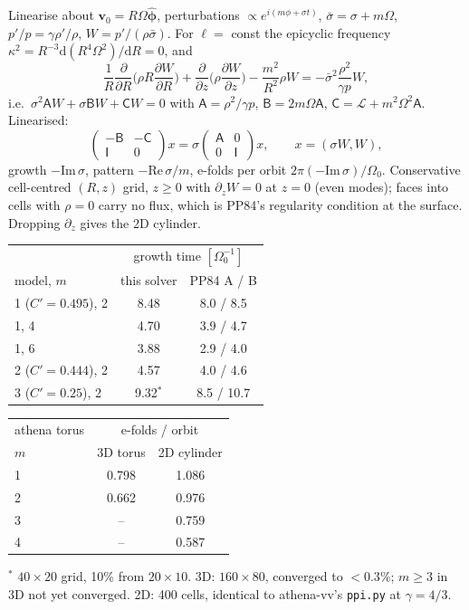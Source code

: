 \documentclass[10pt,a4paper]{article}
\newcommand{\dd}{\mathrm{d}}
\newcommand{\pd}{\partial}
\newcommand{\vv}{\mathbf{v}}
\begin{document}
Linearise about $\vv_0=R\Omega\hat{\boldsymbol\phi}$, perturbations $\propto e^{i(m\phi+\sigma t)}$,
$\bar\sigma=\sigma+m\Omega$, $p'/p=\gamma\rho'/\rho$, $W=p'/(\rho\bar\sigma)$. For
$\ell=$ const the epicyclic frequency $\kappa^2=R^{-3}\dd(R^4\Omega^2)/\dd R=0$, and
\begin{equation}
\frac1R\frac{\pd}{\pd R}\Big(\rho R\frac{\pd W}{\pd R}\Big)+\frac{\pd}{\pd z}\Big(\rho\frac{\pd W}{\pd z}\Big)
-\frac{m^2}{R^2}\rho W=-\bar\sigma^2\frac{\rho^2}{\gamma p}W,
\end{equation}
i.e.\ $\sigma^2\mathsf AW+\sigma\mathsf BW+\mathsf CW=0$ with $\mathsf A=\rho^2/\gamma p$,
$\mathsf B=2m\Omega\mathsf A$, $\mathsf C=\mathcal L+m^2\Omega^2\mathsf A$. Linearised:
\begin{equation}
\begin{pmatrix}-\mathsf B&-\mathsf C\\ \mathsf I&0\end{pmatrix}x=\sigma
\begin{pmatrix}\mathsf A&0\\0&\mathsf I\end{pmatrix}x,\qquad x=(\sigma W,W),
\end{equation}
growth $-\mathrm{Im}\,\sigma$, pattern $-\mathrm{Re}\,\sigma/m$, e-folds per orbit
$2\pi(-\mathrm{Im}\,\sigma)/\Omega_0$. Conservative cell-centred $(R,z)$ grid, $z\ge0$ with
$\pd_zW=0$ at $z=0$ (even modes); faces into cells with $\rho=0$ carry no flux, which is
PP84's regularity condition at the surface. Dropping $\pd_z$ gives the 2D cylinder.

\begin{center}
\begin{tabular}{lcc}
\toprule
& \multicolumn{2}{c}{growth time $[\Omega_0^{-1}]$} \\
model, $m$ & this solver & PP84 A / B \\
\midrule
1 ($C'=0.495$), 2 & 8.48 & 8.0 / 8.5 \\
1, 4 & 4.70 & 3.9 / 4.7 \\
1, 6 & 3.88 & 2.9 / 4.0 \\
2 ($C'=0.444$), 2 & 4.57 & 4.0 / 4.6 \\
3 ($C'=0.25$), 2 & 9.32$^\ast$ & 8.5 / 10.7 \\
\bottomrule
\end{tabular}
\quad
\begin{tabular}{lcc}
\toprule
athena torus & \multicolumn{2}{c}{e-folds / orbit} \\
$m$ & 3D torus & 2D cylinder \\
\midrule
1 & 0.798 & 1.086 \\
2 & 0.662 & 0.976 \\
3 & -- & 0.759 \\
4 & -- & 0.587 \\
\bottomrule
\end{tabular}
\end{center}
$^\ast$ $40\times20$ grid, 10\% from $20\times10$. 3D: $160\times80$, converged to
$<0.3\%$; $m\ge3$ in 3D not yet converged. 2D: 400 cells, identical to athena-vv's
\texttt{ppi.py} at $\gamma=4/3$.
\end{document}
